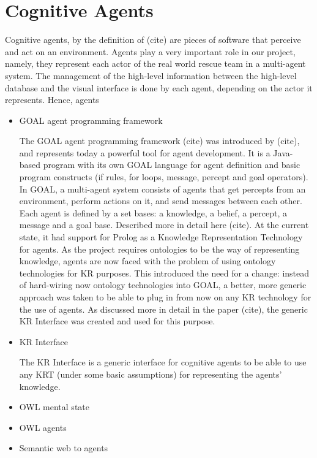 \chapter{Cognitive Agents}

Cognitive agents, by the definition of (cite) are pieces of software that perceive and act on an environment. Agents play a very important role in our project, namely, they represent each actor of the real world rescue team in a multi-agent system. The management of the high-level information between the high-level database and the visual interface is done by each agent, depending on the actor it represents. Hence, agents 

\begin{itemize}
\item GOAL agent programming framework

The GOAL agent programming framework (cite) was introduced by (cite), and represents today a powerful tool for agent development. It is a Java-based program with its own GOAL language for agent definition and basic program constructs (if rules, for loops, message, percept and goal operators). 
In GOAL, a multi-agent system consists of agents that get percepts from an environment, perform actions on it, and send messages between each other. Each agent is defined by a set bases: a knowledge, a belief, a percept, a message and a goal base. Described more in detail here (cite).
At the current state, it had support for Prolog as a Knowledge Representation Technology for agents. 
As the project requires ontologies to be the way of representing knowledge, agents are now faced with the problem of using ontology technologies for KR purposes. This introduced the need for a change: instead of hard-wiring now ontology technologies into GOAL, a better, more generic approach was taken to be able to plug in from now on any KR technology for the use of agents. As discussed more in detail in the paper (cite), the generic KR Interface was created and used for this purpose.

\item KR Interface

The KR Interface is a generic interface for cognitive agents to be able to use any KRT (under some basic assumptions) for representing the agents' knowledge. 


\item OWL mental state

\item OWL agents

\item Semantic web to agents



\end{itemize}
  
  
  
